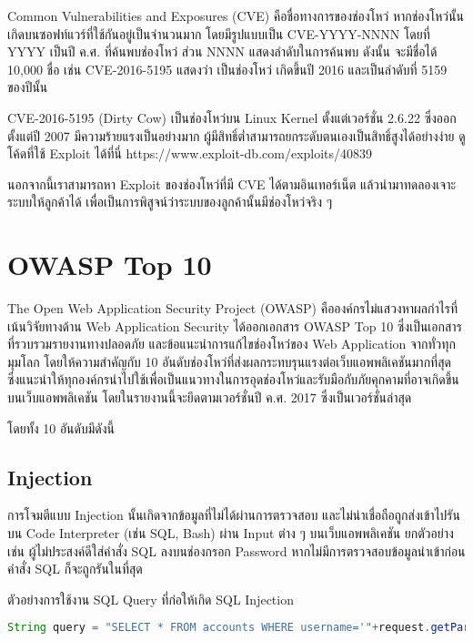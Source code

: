 Common Vulnerabilities and Exposures (CVE) \cite{https://cve.mitre.org/} คือชื่อทางการของช่องโหว่ หากช่องโหว่นั้นเกิดบนซอฟท์แวร์ที่ใช้กันอยู่เป็นจำนวนมาก โดยมีรูปแบบเป็น CVE-YYYY-NNNN โดยที่ YYYY เป็นปี ค.ศ. ที่ค้นพบช่องโหว่ ส่วน NNNN แสดงลำดับในการค้นพบ ดังนั้น จะมีชื่อได้ 10,000 ชื่อ เช่น CVE-2016-5195  \cite{https://dirtycow.ninja/} แสดงว่า เป็นช่องโหว่ เกิดขึ้นปี 2016 และเป็นลำดับที่ 5159 ของปีนั้น

CVE-2016-5195 (Dirty Cow) เป็นช่องโหว่บน Linux Kernel ตั้งแต่เวอร์ชั่น 2.6.22 ซึ่งออกตั้งแต่ปี 2007 มีความร้ายแรงเป็นอย่างมาก ผู้มีสิทธิ์ต่ำสามารถยกระดับตนเองเป็นสิทธิ์สูงได้อย่างง่าย ดูโค้ดที่ใช้ Exploit ได้ที่นี่ https://www.exploit-db.com/exploits/40839

นอกจากนี้เราสามารถหา Exploit ของช่องโหว่ที่มี CVE ได้ตามอินเทอร์เน็ต แล้วนำมาทดลองเจาะระบบให้ลูกค้าได้ เพื่อเป็นการพิสูจน์ว่าระบบของลูกค้านั้นมีช่องโหว่จริง ๆ

\section{OWASP Top 10}

The Open Web Application Security Project (OWASP) คือองค์กรไม่แสวงหาผลกำไรที่เน้นวิจัยทางด้าน Web Application Security ได้ออกเอกสาร OWASP Top 10 ซึ่งเป็นเอกสารที่รวบรวมรายงานทางปลอดภัย และข้อแนะนำการแก้ไขช่องโหว่ของ Web Application จากทั่วทุกมุมโลก โดยให้ความสำคัญกับ 10 อันดับช่องโหว่ที่ส่งผลกระทบรุนแรงต่อเว็บแอพพลิเคชันมากที่สุด ซึ่งแนะนำให้ทุกองค์กรนำไปใช้เพื่อเป็นแนวทางในการอุดช่องโหว่และรับมือกับภัยคุกคามที่อาจเกิดขึ้นบนเว็บแอพพลิเคชัน โดยในรายงานนี้จะยึดตามเวอร์ชั่นปี ค.ศ. 2017 ซึ่งเป็นเวอร์ชั่นล่าสุด \cite{???}

โดยทั้ง 10 อันดับมีดังนี้

\subsection{Injection}

การโจมตีแบบ Injection นั้นเกิดจากข้อมูลที่ไม่ได้ผ่านการตรวจสอบ และไม่น่าเชื่อถือถูกส่งเข้าไปรันบน Code Interpreter (เช่น SQL, Bash) ผ่าน Input ต่าง ๆ บนเว็บแอพพลิเคชัน ยกตัวอย่างเช่น ผู้ไม่ประสงค์ดีใส่คำสั่ง SQL ลงบนช่องกรอก Password หากไม่มีการตรวจสอบข้อมูลนำเข้าก่อน คำสั่ง SQL ก็จะถูกรันในที่สุด

ตัวอย่างการใช้งาน SQL Query ที่ก่อให้เกิด SQL Injection

\begin{lstlisting}[language=Java, numbers=none] 
String query = "SELECT * FROM accounts WHERE username='"+request.getParameter("username") + "'" + "AND password ='" + request.getParameter("password") + "'";
\end{lstlisting}

